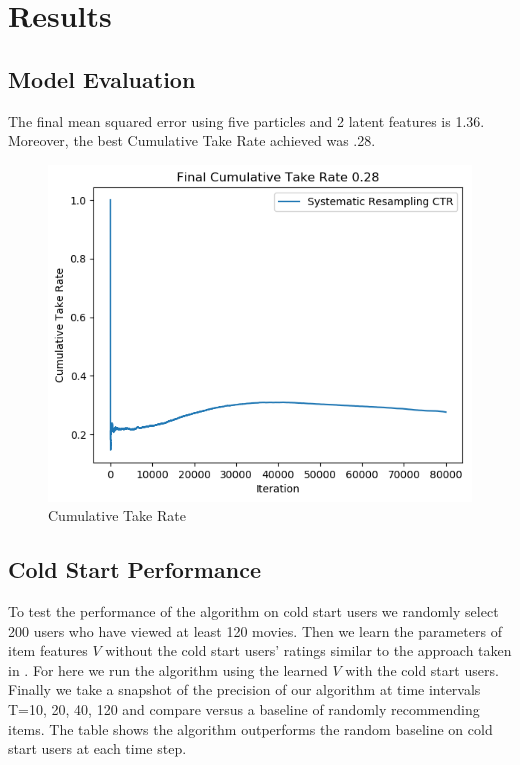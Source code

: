 \documentclass{article}
\begin{document}
\section{Results}

\subsection{Model Evaluation}

The final mean squared error using five particles and 2 latent features is 1.36. Moreover, the best Cumulative Take Rate achieved was .28.

\begin{figure}[ht]
\begin{center}
\centerline{\includegraphics[width=\columnwidth]{CTR}}
\caption{Cumulative Take Rate}
\label{MSEResampling}
\end{center}
\vskip -0.4in
\end{figure}


\subsection{Cold Start Performance}
To test the performance of the algorithm on cold start users we randomly select 200 users who have viewed at least 120 movies. Then we learn the parameters of item features $V$ without the cold start users’ ratings similar to the approach taken in \cite{zhao2013interactive}. For here we run the algorithm using the learned $V$ with the cold start users. Finally we take a snapshot of the precision of our algorithm at time intervals T=10, 20, 40, 120 and compare versus a baseline of randomly recommending items. The table shows the algorithm outperforms the random baseline on cold start users at each time step.
\end{document}

